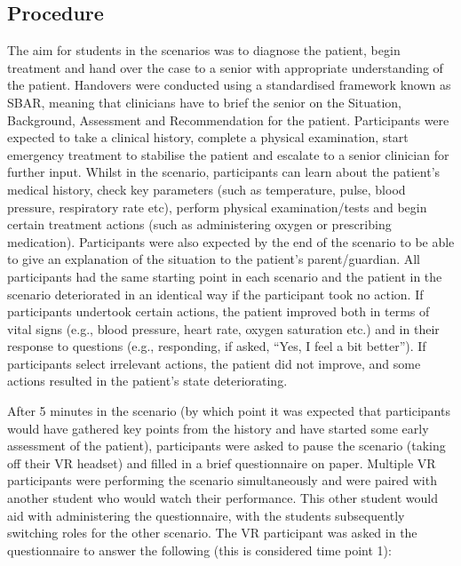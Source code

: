\documentclass[a4paper, nobind]{templates/ociamthesis}
\begin{document}
\subsection{Procedure}\label{procedure-2}

The aim for students in the scenarios was to diagnose the patient, begin treatment and hand over the case to a senior with appropriate understanding of the patient. Handovers were conducted using a standardised framework known as SBAR, meaning that clinicians have to brief the senior on the Situation, Background, Assessment and Recommendation for the patient. Participants were expected to take a clinical history, complete a physical examination, start emergency treatment to stabilise the patient and escalate to a senior clinician for further input. Whilst in the scenario, participants can learn about the patient's medical history, check key parameters (such as temperature, pulse, blood pressure, respiratory rate etc), perform physical examination/tests and begin certain treatment actions (such as administering oxygen or prescribing medication). Participants were also expected by the end of the scenario to be able to give an explanation of the situation to the patient's parent/guardian. All participants had the same starting point in each scenario and the patient in the scenario deteriorated in an identical way if the participant took no action. If participants undertook certain actions, the patient improved both in terms of vital signs (e.g., blood pressure, heart rate, oxygen saturation etc.) and in their response to questions (e.g., responding, if asked, ``Yes, I feel a bit better''). If participants select irrelevant actions, the patient did not improve, and some actions resulted in the patient's state deteriorating.

\hfill\break
After 5 minutes in the scenario (by which point it was expected that participants would have gathered key points from the history and have started some early assessment of the patient), participants were asked to pause the scenario (taking off their VR headset) and filled in a brief questionnaire on paper. Multiple VR participants were performing the scenario simultaneously and were paired with another student who would watch their performance. This other student would aid with administering the questionnaire, with the students subsequently switching roles for the other scenario. The VR participant was asked in the questionnaire to answer the following (this is considered time point 1):
\end{document}
